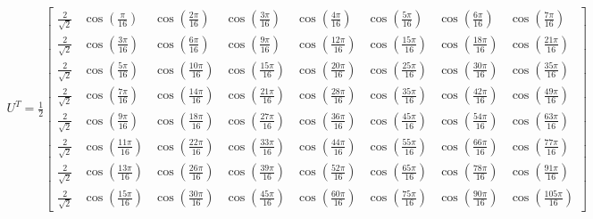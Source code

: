 \documentclass[a4paper]{article}
\begin{document}
\begin{align}
U^T = \frac{1}{2}
\begin{bmatrix}
\frac{2}{\sqrt{2}} & \cos(\frac{\pi}{16}) & \cos(\frac{2  \pi}{16}) & \cos(\frac{3  \pi}{16}) & \cos(\frac{4  \pi}{16}) & \cos(\frac{5  \pi}{16}) & \cos(\frac{6  \pi}{16}) & \cos(\frac{7  \pi}{16}) \\
\frac{2}{\sqrt{2}} & \cos(\frac{3  \pi}{16}) & \cos(\frac{6  \pi}{16}) & \cos(\frac{9  \pi}{16}) & \cos(\frac{12  \pi}{16}) & \cos(\frac{15  \pi}{16}) & \cos(\frac{18  \pi}{16}) & \cos(\frac{21  \pi}{16}) \\
\frac{2}{\sqrt{2}} & \cos(\frac{5  \pi}{16}) & \cos(\frac{10  \pi}{16}) & \cos(\frac{15  \pi}{16}) & \cos(\frac{20  \pi}{16}) & \cos(\frac{25 \pi}{16}) & \cos(\frac{30  \pi}{16}) & \cos(\frac{35  \pi}{16}) \\
\frac{2}{\sqrt{2}} & \cos(\frac{7  \pi}{16}) & \cos(\frac{14  \pi}{16}) & \cos(\frac{21  \pi}{16}) & \cos(\frac{28  \pi}{16}) & \cos(\frac{35  \pi}{16}) & \cos(\frac{42  \pi}{16}) & \cos(\frac{49  \pi}{16}) \\
\frac{2}{\sqrt{2}} & \cos(\frac{9  \pi}{16}) & \cos(\frac{18  \pi}{16}) & \cos(\frac{27  \pi}{16}) & \cos(\frac{36  \pi}{16}) & \cos(\frac{45  \pi}{16}) & \cos(\frac{54  \pi}{16}) & \cos(\frac{63  \pi}{16}) \\
\frac{2}{\sqrt{2}} & \cos(\frac{11  \pi}{16}) & \cos(\frac{22  \pi}{16}) & \cos(\frac{33  \pi}{16}) & \cos(\frac{44  \pi}{16}) & \cos(\frac{55  \pi}{16}) & \cos(\frac{66  \pi}{16}) & \cos(\frac{77  \pi}{16}) \\
\frac{2}{\sqrt{2}} & \cos(\frac{13  \pi}{16}) & \cos(\frac{26  \pi}{16}) & \cos(\frac{39  \pi}{16}) & \cos(\frac{52  \pi}{16}) & \cos(\frac{65  \pi}{16}) & \cos(\frac{78  \pi}{16}) & \cos(\frac{91  \pi}{16}) \\
\frac{2}{\sqrt{2}} & \cos(\frac{15  \pi}{16}) & \cos(\frac{30  \pi}{16}) & \cos(\frac{45  \pi}{16}) & \cos(\frac{60  \pi}{16}) & \cos(\frac{75  \pi}{16}) & \cos(\frac{90  \pi}{16}) & \cos(\frac{105  \pi}{16})
\end{bmatrix}
\end{align}
\end{document}

